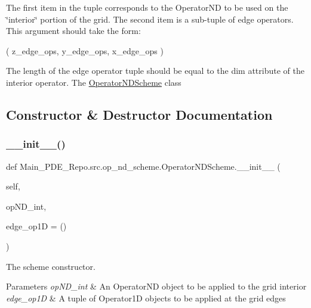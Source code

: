 The first item in the tuple corresponds to the Operator\+ND to be used on the \char`\"{}interior\char`\"{} portion of the grid. The second item is a sub-\/tuple of edge operators. This argument should take the form\+:

( z\+\_\+edge\+\_\+ops, y\+\_\+edge\+\_\+ops, x\+\_\+edge\+\_\+ops )

The length of the edge operator tuple should be equal to the dim attribute of the interior operator. The \hyperlink{classMain__PDE__Repo_1_1src_1_1op__nd__scheme_1_1OperatorNDScheme}{Operator\+N\+D\+Scheme} class 

\subsection{Constructor \& Destructor Documentation}
\mbox{\label{classMain__PDE__Repo_1_1src_1_1op__nd__scheme_1_1OperatorNDScheme_ac4dbbc0240cc4c65f01c481376a352f2}} 
\subsubsection{\texorpdfstring{\+\_\+\+\_\+init\+\_\+\+\_\+()}{\_\_init\_\_()}}
{\footnotesize\ttfamily def Main\+\_\+\+P\+D\+E\+\_\+\+Repo.\+src.\+op\+\_\+nd\+\_\+scheme.\+Operator\+N\+D\+Scheme.\+\_\+\+\_\+init\+\_\+\+\_\+ (\begin{DoxyParamCaption}\item[{}]{self,  }\item[{}]{op\+N\+D\+\_\+int,  }\item[{}]{edge\+\_\+op1D = {\ttfamily ()} }\end{DoxyParamCaption})}



The scheme constructor. 


\begin{DoxyParams}{Parameters}
{\em op\+N\+D\+\_\+int} & An Operator\+ND object to be applied to the grid interior \\
\hline
{\em edge\+\_\+op1D} & A tuple of Operator1D objects to be applied at the grid edges \\
\hline
\end{DoxyParams}



